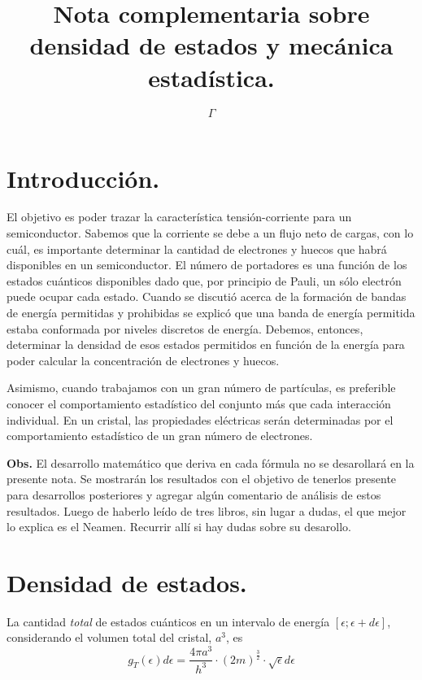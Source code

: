 \documentclass[12pt,a4paper]{article}
\begin{document}
\title{Nota complementaria sobre densidad de estados y mecánica estadística.}

\author{$\Gamma$}

\maketitle

\section{Introducción.}

El objetivo es poder trazar la característica tensión-corriente para un semiconductor. Sabemos que la corriente se debe a un flujo neto de cargas, con lo cuál, es importante determinar la cantidad de electrones y huecos que habrá disponibles en un semiconductor. El número de portadores es una función de los estados cuánticos disponibles dado que, por principio de Pauli, un sólo electrón puede ocupar cada estado. Cuando se discutió acerca de la formación de bandas de energía permitidas y prohibidas se explicó que una banda de energía permitida estaba conformada por niveles discretos de energía. Debemos, entonces, determinar la densidad de esos estados permitidos en función de la energía para poder calcular la concentración de electrones y huecos.

Asimismo, cuando trabajamos con un gran número de partículas, es preferible conocer el comportamiento estadístico del conjunto más que cada interacción individual. En un cristal, las propiedades eléctricas serán determinadas por el comportamiento estadístico de un gran número de electrones.

\textbf{Obs.} El desarrollo matemático que deriva en cada fórmula no se desarollará en la presente nota. Se mostrarán los resultados con el objetivo de tenerlos presente para desarrollos posteriores y agregar algún comentario de análisis de estos resultados. Luego de haberlo leído de tres libros, sin lugar a dudas, el que mejor lo explica es el Neamen. Recurrir allí si hay dudas sobre su desarollo.

\section{Densidad de estados.}

La cantidad \emph{total} de estados cuánticos en un intervalo de energía $[\epsilon ; \epsilon+d\epsilon]$, considerando el volumen total del cristal, $a^{3}$, es
\[ g_{T}(\epsilon) d\epsilon = \frac{4 \pi a^{3}}{h^{3}} \cdot (2m)^{\frac{3}{2}} \cdot \sqrt{\epsilon}d\epsilon \]
\end{document}
